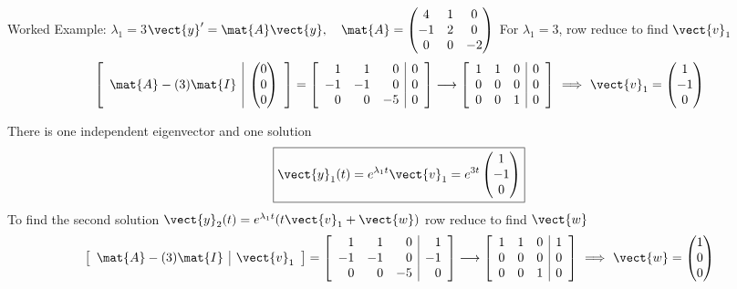 \documentclass[11pt,aspectratio=169]{beamer}
\begin{document}
\begin{frame}{Worked Example: \(\lambda_1=3\)\quad \(\vect{y}'=\mat{A}\vect{y},\quad \mat{A}=\begin{pmatrix}4&1&0\\-1&2&0\\0&0&-2\end{pmatrix}\)}
\small
\setlength{\abovedisplayskip}{3pt}
\setlength{\belowdisplayskip}{3pt}
\setlength{\jot}{1pt}
\renewcommand{\arraystretch}{0.85}
For \(\lambda_1=3\), row reduce to find \(\vect{v}_1\)
\[
\left[\begin{array}{c|c}\mat{A}-(3)\mat{I}&\begin{pmatrix}0\\0\\0\end{pmatrix}\end{array}\right]=\left[\begin{array}{rrr|r}1&1&0&0\\-1&-1&0&0\\0&0&-5&0\end{array}\right]
\longrightarrow
\left[\begin{array}{rrr|r}1&1&0&0\\0&0&0&0\\0&0&1&0\end{array}\right]
\ \Longrightarrow\ \vect{v}_1=\begin{pmatrix}1\\-1\\0\end{pmatrix}
\]
\par\medskip
There is one independent eigenvector and one solution
\[
\boxed{\vect{y}_1(t)=e^{\lambda_1 t}\vect{v}_1=e^{3t}\begin{pmatrix}1\\-1\\0\end{pmatrix}}
\]
To find the second solution \(\vect{y}_2(t)=e^{\lambda_1 t}(t\vect{v}_1+\vect{w})\) row reduce to find \(\vect{w}\)
\[
\left[\begin{array}{c|c}\mat{A}-(3)\mat{I}&\vect{v}_1\end{array}\right]=\left[\begin{array}{rrr|r}1&1&0&1\\-1&-1&0&-1\\0&0&-5&0\end{array}\right]
\longrightarrow
\left[\begin{array}{rrr|r}1&1&0&1\\0&0&0&0\\0&0&1&0\end{array}\right]
\ \Longrightarrow\ \vect{w}=\begin{pmatrix}1\\0\\0\end{pmatrix}
\]
\end{frame}
\end{document}
